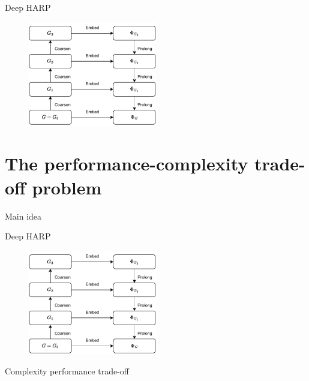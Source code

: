 \documentclass[10pt, aspectratio=169]{beamer}
\begin{document}
\begin{frame}{Deep HARP}
	\begin{figure}
		\centering
		\includegraphics[width=0.5\textwidth]{images/deep-harp/deep-harp.pdf}
	\end{figure}
\end{frame}

\section{The performance-complexity trade-off problem}

\begin{frame}{Main idea}
	\centering
    
\end{frame}

\begin{frame}{Deep HARP}
	\begin{figure}
		\centering
		\includegraphics[width=0.5\textwidth]{images/deep-harp/deep-harp.pdf}
	\end{figure}
\end{frame}

\begin{frame}{Complexity performance trade-off}
	
\end{frame}
\end{document}
